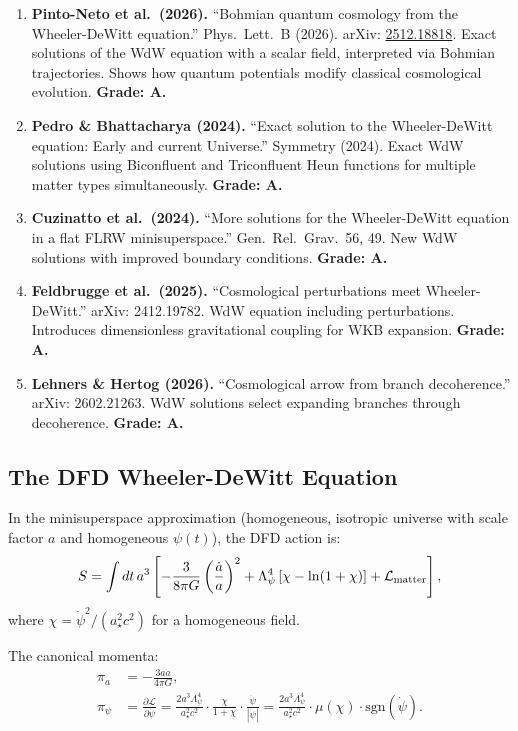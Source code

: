 \documentclass[11pt,a4paper]{article}
\begin{document}
\begin{enumerate}
\item \textbf{Pinto-Neto et al.\ (2026).} ``Bohmian quantum cosmology from the Wheeler-DeWitt equation.'' Phys.\ Lett.\ B (2026). arXiv: \href{https://arxiv.org/abs/2512.18818}{2512.18818}. Exact solutions of the WdW equation with a scalar field, interpreted via Bohmian trajectories. Shows how quantum potentials modify classical cosmological evolution. \textbf{Grade: A.}

\item \textbf{Pedro \& Bhattacharya (2024).} ``Exact solution to the Wheeler-DeWitt equation: Early and current Universe.'' Symmetry (2024). Exact WdW solutions using Biconfluent and Triconfluent Heun functions for multiple matter types simultaneously. \textbf{Grade: A.}

\item \textbf{Cuzinatto et al.\ (2024).} ``More solutions for the Wheeler-DeWitt equation in a flat FLRW minisuperspace.'' Gen.\ Rel.\ Grav.\ 56, 49. New WdW solutions with improved boundary conditions. \textbf{Grade: A.}

\item \textbf{Feldbrugge et al.\ (2025).} ``Cosmological perturbations meet Wheeler-DeWitt.'' arXiv: 2412.19782. WdW equation including perturbations. Introduces dimensionless gravitational coupling for WKB expansion. \textbf{Grade: A.}

\item \textbf{Lehners \& Hertog (2026).} ``Cosmological arrow from branch decoherence.'' arXiv: 2602.21263. WdW solutions select expanding branches through decoherence. \textbf{Grade: A.}
\end{enumerate}

\subsection{The DFD Wheeler-DeWitt Equation}

In the minisuperspace approximation (homogeneous, isotropic universe with scale factor $a$ and homogeneous $\psi(t)$), the DFD action is:
\begin{equation}
S = \int dt\,a^3\left[-\frac{3}{8\pi G}\left(\frac{\dot{a}}{a}\right)^2 + \Lambda_\psi^4\left[\chi - \ln(1+\chi)\right] + \mathcal{L}_{\rm matter}\right],
\end{equation}
where $\chi = \dot\psi^2/(a_\star^2 c^2)$ for a homogeneous field.

The canonical momenta:
\begin{align}
\pi_a &= -\frac{3a\dot{a}}{4\pi G}, \\
\pi_\psi &= \frac{\partial\mathcal{L}}{\partial\dot\psi} = \frac{2a^3\Lambda_\psi^4}{a_\star^2 c^2}\cdot\frac{\chi}{1+\chi}\cdot\frac{\dot\psi}{|\dot\psi|} = \frac{2a^3\Lambda_\psi^4}{a_\star^2 c^2}\cdot\mu(\chi)\cdot\text{sgn}(\dot\psi).
\end{align}
\end{document}
